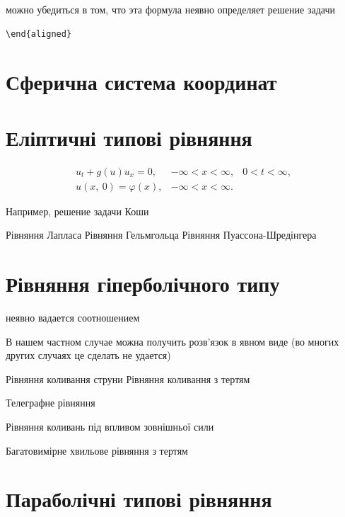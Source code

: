 \documentclass[
  ukrainian,
]{article}
\begin{document}
можно убедиться в том, что эта формула неявно определяет решение задачи

\begin{verbatim}
\end{aligned}
\end{verbatim}

\section{Сферична система
координат}\label{ux441ux444ux435ux440ux438ux447ux43dux430-ux441ux438ux441ux442ux435ux43cux430-ux43aux43eux43eux440ux434ux438ux43dux430ux442}

\section{Еліптичні типові
рівняння}\label{ux435ux43bux456ux43fux442ux438ux447ux43dux456-ux442ux438ux43fux43eux432ux456-ux440ux456ux432ux43dux44fux43dux43dux44f}

\[
\begin{aligned} u_t + g\left(u\right) u_x = 0, & -\infty < x < \infty, & 0 < t < \infty, \\ u\left(x, \ 0\right) = \varphi\left(x\right), & -\infty < x < \infty. \end{aligned}
\]

Например, решение задачи Коши

Рівняння Лапласа Рівняння Гельмгольца Рівняння Пуассона-Шредінгера

\section{Рівняння гіперболічного
типу}\label{ux440ux456ux432ux43dux44fux43dux43dux44f-ux433ux456ux43fux435ux440ux431ux43eux43bux456ux447ux43dux43eux433ux43e-ux442ux438ux43fux443}

неявно вадается соотношением

В нашем частном случае можна получить розв'язок в явном виде (во многих
других случаях це сделать не удается)

Рівняння коливання струни Рівняння коливання з тертям

Телеграфне рівняння

Рівняння коливань під впливом зовнішньої сили

Багатовимірне хвильове рівняння з тертям

\section{Параболічні типові
рівняння}\label{ux43fux430ux440ux430ux431ux43eux43bux456ux447ux43dux456-ux442ux438ux43fux43eux432ux456-ux440ux456ux432ux43dux44fux43dux43dux44f}
\end{document}
